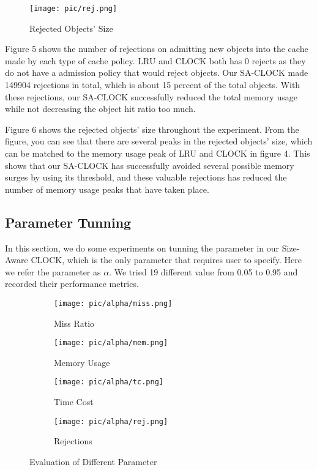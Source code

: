 \documentclass[conference]{IEEEtran}
\begin{document}
\begin{figure}[h]
\centerline{\texttt{[image: pic/rej.png]}}
\caption{Rejected Objects' Size}
\label{fig}
\end{figure}

Figure 5 shows the number of rejections on admitting new objects into the cache made by each type of cache policy. LRU and CLOCK both has 0 rejects as they do not have a admission policy that would reject objects. Our SA-CLOCK made 149904 rejections in total, which is about 15 percent of the total objects. With these rejections, our SA-CLOCK successfully reduced the total memory usage while not decreasing the object hit ratio too much.

Figure 6 shows the rejected objects' size throughout the experiment. From the figure, you can see that there are several peaks in the rejected objects' size, which can be matched to the memory usage peak of LRU and CLOCK in figure 4. This shows that our SA-CLOCK has successfully avoided several possible memory surges by using its threshold, and these valuable rejections has reduced the number of memory usage peaks that have taken place. 


\subsection{Parameter Tunning}
In this section, we do some experiments on tunning the parameter in our Size-Aware CLOCK, which is the only parameter that requires user to specify. Here we refer the parameter as $\alpha$. We tried 19 different value from 0.05 to 0.95 and recorded their performance metrics.

\begin{figure}
  \centering
  \begin{subfigure}[h]{0.4\textwidth}
    \texttt{[image: pic/alpha/miss.png]}
    \caption{Miss Ratio}
    \label{fig:sub1}
  \end{subfigure}
  \hfill
  \begin{subfigure}[h]{0.4\textwidth}
    \texttt{[image: pic/alpha/mem.png]}
    \caption{Memory Usage}
    \label{fig:sub2}
  \end{subfigure}
  
  \medskip
  
  \begin{subfigure}[h]{0.4\textwidth}
    \texttt{[image: pic/alpha/tc.png]}
    \caption{Time Cost}
    \label{fig:sub3}
  \end{subfigure}
  \hfill
  \begin{subfigure}[h]{0.4\textwidth}
    \texttt{[image: pic/alpha/rej.png]}
    \caption{Rejections}
    \label{fig:sub4}
  \end{subfigure}
  
  \caption{Evaluation of Different Parameter}
  \label{fig:main} 
\end{figure}
\end{document}
